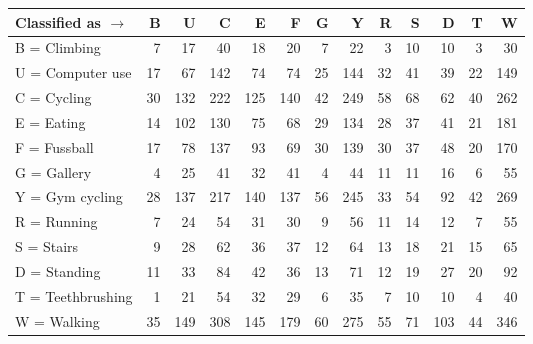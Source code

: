 \begin{tabular}{lrrrrrrrrrrrr}
\toprule
Classified as $\rightarrow$ &   B &    U &    C &    E &    F &   G &    Y &   R &   S &    D &   T &    W \\
\midrule
B = Climbing      &   7 &   17 &   40 &   18 &   20 &   7 &   22 &   3 &  10 &   10 &   3 &   30 \\
U = Computer use  &  17 &   67 &  142 &   74 &   74 &  25 &  144 &  32 &  41 &   39 &  22 &  149 \\
C = Cycling       &  30 &  132 &  222 &  125 &  140 &  42 &  249 &  58 &  68 &   62 &  40 &  262 \\
E = Eating        &  14 &  102 &  130 &   75 &   68 &  29 &  134 &  28 &  37 &   41 &  21 &  181 \\
F = Fussball      &  17 &   78 &  137 &   93 &   69 &  30 &  139 &  30 &  37 &   48 &  20 &  170 \\
G = Gallery       &   4 &   25 &   41 &   32 &   41 &   4 &   44 &  11 &  11 &   16 &   6 &   55 \\
Y = Gym cycling   &  28 &  137 &  217 &  140 &  137 &  56 &  245 &  33 &  54 &   92 &  42 &  269 \\
R = Running       &   7 &   24 &   54 &   31 &   30 &   9 &   56 &  11 &  14 &   12 &   7 &   55 \\
S = Stairs        &   9 &   28 &   62 &   36 &   37 &  12 &   64 &  13 &  18 &   21 &  15 &   65 \\
D = Standing      &  11 &   33 &   84 &   42 &   36 &  13 &   71 &  12 &  19 &   27 &  20 &   92 \\
T = Teethbrushing &   1 &   21 &   54 &   32 &   29 &   6 &   35 &   7 &  10 &   10 &   4 &   40 \\
W = Walking       &  35 &  149 &  308 &  145 &  179 &  60 &  275 &  55 &  71 &  103 &  44 &  346 \\
\bottomrule
\end{tabular}
